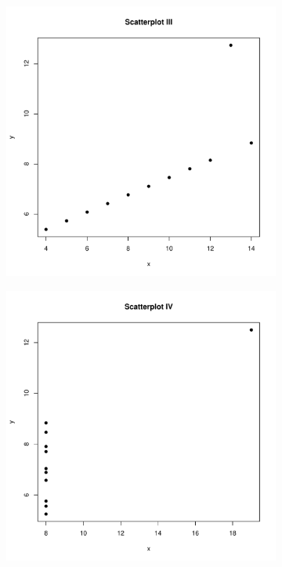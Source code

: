 \documentclass[a4paper]{article}
\begin{document}
\begin{enumerate}
\begin{figure}[!ht]
\begin{subfigure}{.35\textwidth}
		\end{subfigure}
		\begin{subfigure}{.35\textwidth}
			\includegraphics[width=\linewidth]{ScatterplotIII.pdf}
		\end{subfigure}
		\begin{subfigure}{.35\textwidth}
			\includegraphics[width=\linewidth]{ScatterplotIV.pdf}
		\end{subfigure}		
		

\end{figure}
\end{enumerate}
\end{document}

